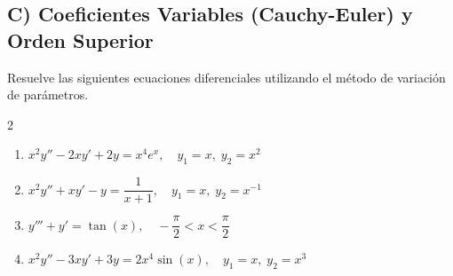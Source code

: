 \documentclass[a4paper,11pt]{article}
\begin{document}
\subsection*{C) Coeficientes Variables (Cauchy-Euler) y Orden Superior}
Resuelve las siguientes ecuaciones diferenciales utilizando el método de variación de parámetros.

\begin{multicols}{2}
\begin{enumerate}[itemsep=0.15cm]
    \item $x^2 y'' - 2x y' + 2y = x^4 e^x, \quad y_1 = x, \; y_2 = x^2$
    \item $x^2 y'' + x y' - y = \dfrac{1}{x+1}, \quad y_1 = x, \; y_2 = x^{-1}$
    \item $y''' + y' = \tan(x), \quad -\dfrac{\pi}{2} < x < \dfrac{\pi}{2}$
    \item $x^2 y'' - 3x y' + 3y = 2x^4 \sin(x), \quad y_1 = x, \; y_2 = x^3$
\end{enumerate}
\end{multicols}
\end{document}
